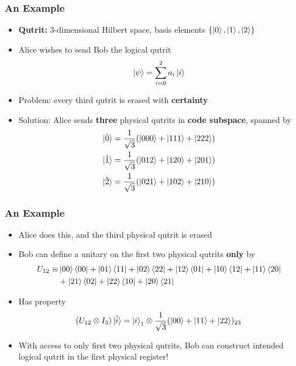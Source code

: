 \documentclass[11pt]{beamer}
\newcommand{\ketbra}[2]{\ket{#1}\bra{#2}}
\newcommand{\ketbras}[1]{\ketbra{#1}{#1}}
\begin{document}
	\begin{frame}
		\frametitle{An Example}
		\begin{itemize}[<+->]
			\item \textbf{Qutrit:} 3-dimensional Hilbert space, basis elements $\{\ket{0},\ket{1},\ket{2}\}$
			\item Alice wishes to send Bob the logical qutrit 
			\begin{equation}
				\ket{\psi}=\sum_{i=0}^{2}a_{i}\ket{i}
			\end{equation}
			\item Problem: every third qutrit is erased with \textbf{certainty}
			\item Solution: Alice sends \textbf{three} physical qutrits in \textbf{code subspace}, spanned by
			\begin{equation}
				\begin{aligned}
					\ket{\tilde{0}}&=\frac{1}{\sqrt{3}}(\ket{{000}}+\ket{{111}}+\ket{{222}})\\
					\ket{\tilde{1}}&=\frac{1}{\sqrt{3}}(\ket{{012}}+\ket{{120}}+\ket{{201}})\\
					\ket{\tilde{2}}&=\frac{1}{\sqrt{3}}(\ket{{021}}+\ket{{102}}+\ket{{210}})
				\end{aligned}
			\end{equation}
		\end{itemize}
	\end{frame}

	\begin{frame}
		\frametitle{An Example}
		\begin{itemize}[<+->]
			\item Alice does this, and the third physical qutrit is erased
			\item Bob can define a unitary on the first two physical qutrits \textbf{only} by
			\begin{equation}
				\begin{aligned}
					U_{12}\equiv&\ketbras{{00}}+\ketbra{{01}}{{11}}+\ketbra{{02}}{{22}}+\ketbra{{12}}{{01}}+\ketbra{{10}}{{12}}+\ketbra{{11}}{{20}}\\&+\ketbra{{21}}{{02}}+\ketbra{{22}}{{10}}+\ketbra{{20}}{{21}}
				\end{aligned}
			\end{equation}
			\item Has property
			\begin{equation}
				(U_{12}\otimes I_{3})\ket{\tilde{i}}=\ket{i}_{1}\otimes\frac{1}{\sqrt{3}}(\ket{00}+\ket{11}+\ket{22})_{23}
			\end{equation}
			\item With access to only first two physical qutrits, Bob can construct intended logical qutrit in the first physical register!
		\end{itemize}
	\end{frame}
\end{document}
